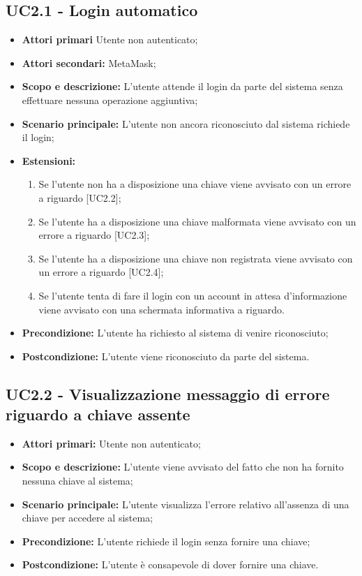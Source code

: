 \documentclass[AnalisiDeiRequisiti.tex]{subfiles}
\begin{document}
\subsection{UC2.1 - Login automatico}
\begin{itemize}
\item \textbf{Attori primari} Utente non autenticato;\\
\item \textbf{Attori secondari:} MetaMask;\\
\item \textbf{Scopo e descrizione:} L'utente attende il login da parte del sistema senza effettuare nessuna operazione aggiuntiva;\\
\item \textbf{Scenario principale:} L'utente non ancora riconosciuto dal sistema richiede il login;\\
\item \textbf{Estensioni:}\\
\begin{enumerate}
	\item Se l'utente non ha a disposizione una chiave viene avvisato con un errore a riguardo [UC2.2];
	\item Se l'utente ha a disposizione una chiave malformata viene avvisato con un errore a riguardo [UC2.3];
	\item Se l'utente ha a disposizione una chiave non registrata viene avvisato con un errore a riguardo [UC2.4];
	\item Se l'utente tenta di fare il login con un account in attesa d'informazione viene avvisato con una schermata informativa a riguardo.
\end{enumerate}
\item \textbf{Precondizione:} L'utente ha richiesto al sistema di venire riconosciuto;\\
\item \textbf{Postcondizione:} L'utente viene riconosciuto da parte del sistema.\\
\end{itemize}
\subsection{UC2.2 - Visualizzazione messaggio di errore riguardo a chiave assente}
\begin{itemize}
	\item \textbf{Attori primari:} Utente non autenticato;\\
	\item \textbf{Scopo e descrizione:} L'utente viene avvisato del fatto che non ha fornito nessuna chiave al sistema;\\
	\item \textbf{Scenario principale:} L'utente visualizza l'errore relativo all'assenza di una chiave per accedere al sistema;\\
	\item \textbf{Precondizione:} L'utente richiede il login senza fornire una chiave;\\
	\item \textbf{Postcondizione:} L'utente è consapevole di dover fornire una chiave. \\
\end{itemize}
\end{document}
